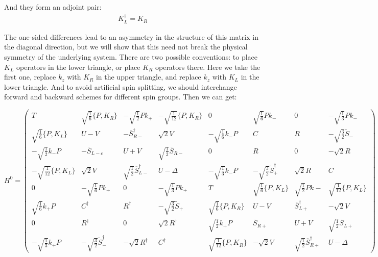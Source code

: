 \documentclass[prb,aps]{revtex4}
\begin{document}
		And they form an adjoint pair:
		\begin{align}
			K_L^\dagger = K_R
		\end{align}

The one-sided differences lead to an asymmetry in the structure of this matrix in the diagonal direction, but we will show that this need not break the physical symmetry of the underlying system. There are two possible conventions: to place $K_L$ operators in the lower triangle, or place $K_R$ operators there. Here we take the first one, replace $k_z$ with $K_R$ in the upper triangle, and replace $k_z$ with $K_L$ in the lower triangle. And to avoid artificial spin splitting, we should interchange forward and backward schemes for different spin groups. Then we can get:

		\begin{equation}
		    \renewcommand{\arraystretch}{3.5}
			\label{eq:H0}
			H^0=
			\begin{pmatrix}
				T & \sqrt{\frac{1}{6}} \{P, K_R\} & -\sqrt{\frac12} P k_+  & -\sqrt{\frac{1}{12}} \{P, K_R\} & 0 &  \sqrt{\frac16} P k_- & 0  & -\sqrt{\frac13} P k_-\\ 
				\sqrt{\frac{1}{6}} \{P, K_L\} &  U-V &  - \overline{S}_{R-}^\dagger & \sqrt{2} V & -\sqrt{\frac16} k_- P & C & R & -\sqrt{\frac32} \tilde{S}_- \\ 
				-\sqrt{\frac12}  k_- P & -\overline{S}_{L-c} & U+V &  \sqrt{\frac12} \overline{S}_{R-} & 0 & R & 0 & -\sqrt{2} R \\ 
				-\sqrt{\frac{1}{12}} \{P, K_L\} & \sqrt{2} V &  \sqrt{\frac12} \overline{S}^{\dag}_{L-} &  U - Δ &-\sqrt{\frac13} k_- P & -\sqrt{\frac32} \tilde{S}^\dag_+ & \sqrt{2} R & C \\ 
				0 & -\sqrt{\frac16} P k_+ & 0 & -\sqrt{\frac13} P k_+ & T &  \sqrt{\frac{1}{6}} \{P, K_L\} &  \sqrt{\frac12} P k- & \sqrt{\frac{1}{12}} \{P, K_L\}\\ 
				\sqrt{\frac16} k_+ P & C^\dagger & R^\dagger &  -\sqrt{\frac32} \tilde{S}_+ & \sqrt{\frac{1}{6}} \{P, K_R\} & U-V & \overline{S}_{L+}^\dagger & -\sqrt{2} V \\ 
				0 & R^\dagger & 0 & \sqrt{2} R^\dag & \sqrt{\frac12} k_+ P & \overline{S}_{R+} & U+V & \sqrt{\frac12} \overline{S}_{L+} \\ 
				-\sqrt{\frac13} k_+ P & -\sqrt{\frac32} \tilde{S}_-^\dag & -\sqrt{2} R^\dag & C^\dag & \sqrt{\frac{1}{12}} \{P, K_R\} & -\sqrt{2} V & \sqrt{\frac12} \overline{S}_{R+}^\dag & U - Δ     
			\end{pmatrix}
		\end{equation}
		
\end{document}
